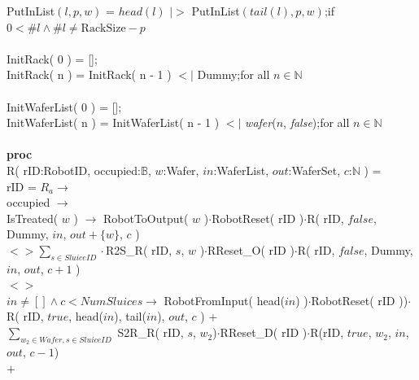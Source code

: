 \documentclass[12pt]{report}
\begin{document}
	\phantom{----} PutInList$( l, p, w )$ = $ head( l )$ $|>$ PutInList$( tail( l ), p, w )$;\hfill if $0 < \#l \land \#l \neq \text{RackSize} - p$\\
	\\
	\phantom{----} InitRack( 0 ) = [];\\
	\phantom{----} InitRack( n ) = InitRack( n - 1 ) $<|$ Dummy;\hfill for all $n \in \mathbb{N}$\\
	\\
	\phantom{----} InitWaferList( 0 ) = [];\\
	\phantom{----} InitWaferList( n ) = InitWaferList( n - 1 ) $<|$ \emph{wafer}($n$, \emph{false});\hfill for all $n \in \mathbb{N}$\\
	\\
	\textbf{proc}\\
	\phantom{----} R( rID:RobotID, occupied:$\mathbb{B}$, $w$:Wafer, $in$:WaferList, $out$:WaferSet, $c$:$\mathbb{N}$ ) =\\
	\phantom{--------} rID = $R_a \rightarrow$\\
	\phantom{-----------} occupied $\rightarrow$\\
	\phantom{--------------} IsTreated( $w$ ) $\rightarrow$ RobotToOutput( $w$ )$\cdot$RobotReset( rID )$\cdot$R( rID, $false$, Dummy, $in$, $out + \{w\}$, $c$ )\\
	\phantom{--------------} $<> \sum\nolimits_{s \in SluiceID}\cdot$R2S\_R( rID, $s$, $w$ )$\cdot$RReset\_O( rID )$\cdot$R( rID, $false$, Dummy, $in$, $out$, $c + 1$ )\\
	\phantom{-----------} $<>$\\
	\phantom{--------------} $in \neq [] \land c < NumSluices \rightarrow$ RobotFromInput( head($in$) )$\cdot$RobotReset( rID ))$\cdot$R( rID, $true$, head($in$), tail($in$), $out$, $c$ ) + \\
	\phantom{--------------} $\sum\nolimits_{w_2 \in Wafer, s \in SluiceID}$ S2R\_R( rID, $s$, $w_2$)$\cdot$RReset\_D( rID )$\cdot$R(rID, $true$, $w_2$, $in$, $out$, $c-1$)\\
	\phantom{-----------} $+$\\
	
	
\end{document}
